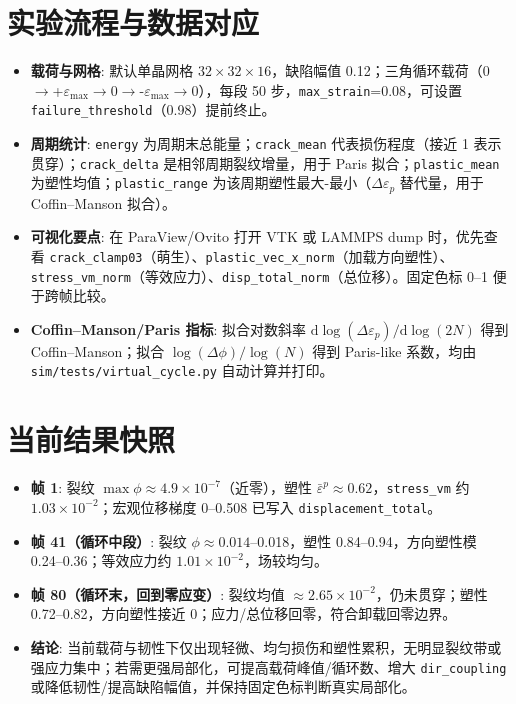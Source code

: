 \documentclass[11pt]{article}
\begin{document}
\section{实验流程与数据对应}
\begin{itemize}
    \item \textbf{载荷与网格}: 默认单晶网格 $32\times32\times16$，缺陷幅值 0.12；三角循环载荷（0$\rightarrow$+$\varepsilon_{\max}\rightarrow$0$\rightarrow$-$\varepsilon_{\max}\rightarrow$0），每段 50 步，\texttt{max\_strain}=0.08，可设置 \texttt{failure\_threshold}（0.98）提前终止。
    \item \textbf{周期统计}: \texttt{energy} 为周期末总能量；\texttt{crack\_mean} 代表损伤程度（接近 1 表示贯穿）；\texttt{crack\_delta} 是相邻周期裂纹增量，用于 Paris 拟合；\texttt{plastic\_mean} 为塑性均值；\texttt{plastic\_range} 为该周期塑性最大-最小（$\Delta\varepsilon_p$ 替代量，用于 Coffin--Manson 拟合）。
    \item \textbf{可视化要点}: 在 ParaView/Ovito 打开 VTK 或 LAMMPS dump 时，优先查看 \texttt{crack\_clamp03}（萌生）、\texttt{plastic\_vec\_x\_norm}（加载方向塑性）、\texttt{stress\_vm\_norm}（等效应力）、\texttt{disp\_total\_norm}（总位移）。固定色标 0--1 便于跨帧比较。
    \item \textbf{Coffin--Manson/Paris 指标}: 拟合对数斜率 $\mathrm{d}\log(\Delta\varepsilon_p)/\mathrm{d}\log(2N)$ 得到 Coffin--Manson；拟合 $\log(\Delta\phi)/\log(N)$ 得到 Paris-like 系数，均由 \texttt{sim/tests/virtual\_cycle.py} 自动计算并打印。
\end{itemize}

\section{当前结果快照}
\begin{itemize}
    \item \textbf{帧 1}: 裂纹 $\max\phi\approx4.9\times10^{-7}$（近零），塑性 $\bar{\varepsilon}^p\approx0.62$，\texttt{stress\_vm} 约 $1.03\times10^{-2}$；宏观位移梯度 0--0.508 已写入 \texttt{displacement\_total}。
    \item \textbf{帧 41（循环中段）}: 裂纹 $\phi\approx0.014$--0.018，塑性 0.84--0.94，方向塑性模 0.24--0.36；等效应力约 $1.01\times10^{-2}$，场较均匀。
    \item \textbf{帧 80（循环末，回到零应变）}: 裂纹均值 $\approx2.65\times10^{-2}$，仍未贯穿；塑性 0.72--0.82，方向塑性接近 0；应力/总位移回零，符合卸载回零边界。
    \item \textbf{结论}: 当前载荷与韧性下仅出现轻微、均匀损伤和塑性累积，无明显裂纹带或强应力集中；若需更强局部化，可提高载荷峰值/循环数、增大 \texttt{dir\_coupling} 或降低韧性/提高缺陷幅值，并保持固定色标判断真实局部化。
\end{itemize}
\end{document}
